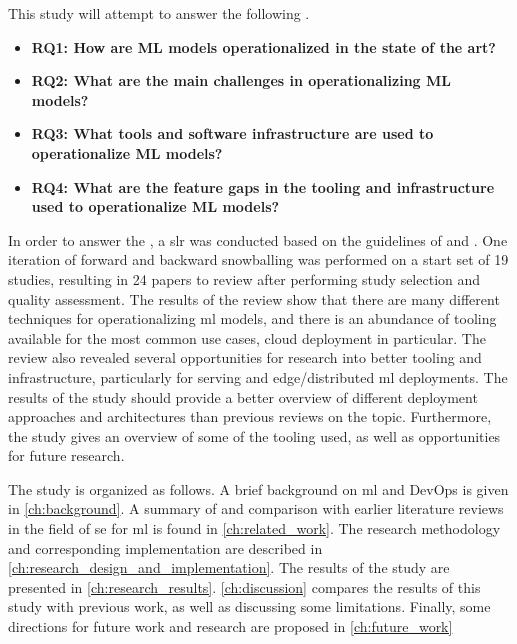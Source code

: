 This study will attempt to answer the following .
\begin{itemize}
    \item \textbf{RQ1: How are ML models operationalized in the state of the art?}
    \item \textbf{RQ2: What are the main challenges in operationalizing ML models?}
    \item \textbf{RQ3: What tools and software infrastructure are used to operationalize ML models?}
    \item \textbf{RQ4: What are the feature gaps in the tooling and infrastructure used to operationalize ML models?}
\end{itemize}
In order to answer the , a \acrfull{slr} was conducted based on the guidelines of \cite{Kitchenham07guidelinesfor} and \cite{Wohlin2014}.
One iteration of forward and backward snowballing was performed on a start set of 19 studies, resulting in 24 papers to review after performing study selection and quality assessment.
The results of the review show that there are many different techniques for operationalizing \acrshort{ml} models, and there is an abundance of tooling available for the most common use cases, cloud deployment in particular.
The review also revealed several opportunities for research into better tooling and infrastructure, particularly for serving and edge/distributed \acrshort{ml} deployments.
The results of the study should provide a better overview of different deployment approaches and architectures than previous reviews on the topic.
Furthermore, the study gives an overview of some of the tooling used, as well as opportunities for future research.

The study is organized as follows.
A brief background on \acrshort{ml} and DevOps is given in \cref{ch:background}.
A summary of and comparison with earlier literature reviews in the field of \acrshort{se} for \acrshort{ml} is found in \cref{ch:related_work}.
The research methodology and corresponding implementation are described in \cref{ch:research_design_and_implementation}.
The results of the study are presented in \cref{ch:research_results}.
\cref{ch:discussion} compares the results of this study with previous work, as well as discussing some limitations.
Finally, some directions for future work and research are proposed in \cref{ch:future_work}
